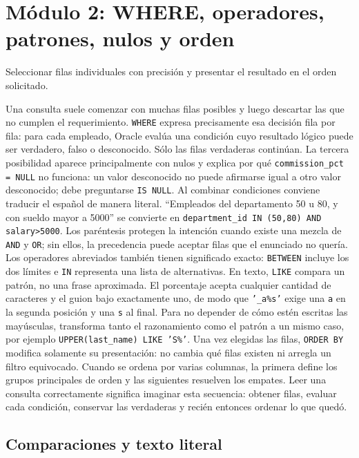 \documentclass[11pt,a4paper]{article}
\newcommand{\campo}[1]{\texttt{#1}}
\begin{document}
\section{Módulo 2: WHERE, operadores, patrones, nulos y orden}

\begin{objetivo}
Seleccionar filas individuales con precisión y presentar el resultado en el orden solicitado.
\end{objetivo}

Una consulta suele comenzar con muchas filas posibles y luego descartar las que no cumplen el
requerimiento. \campo{WHERE} expresa precisamente esa decisión fila por fila: para cada empleado,
Oracle evalúa una condición cuyo resultado lógico puede ser verdadero, falso o desconocido. Sólo las
filas verdaderas continúan. La tercera posibilidad aparece principalmente con nulos y explica por qué
\campo{commission_pct = NULL} no funciona: un valor desconocido no puede afirmarse igual a otro
valor desconocido; debe preguntarse \campo{IS NULL}. Al combinar condiciones conviene traducir el
español de manera literal. ``Empleados del departamento 50 u 80, y con sueldo mayor a 5000'' se
convierte en \campo{department_id IN (50,80) AND salary>5000}. Los paréntesis protegen la intención
cuando existe una mezcla de \campo{AND} y \campo{OR}; sin ellos, la precedencia puede aceptar filas
que el enunciado no quería. Los operadores abreviados también tienen significado exacto:
\campo{BETWEEN} incluye los dos límites e \campo{IN} representa una lista de alternativas. En texto,
\campo{LIKE} compara un patrón, no una frase aproximada. El porcentaje acepta cualquier cantidad de
caracteres y el guion bajo exactamente uno, de modo que \campo{'\_a\%s'} exige una \campo{a} en la
segunda posición y una \campo{s} al final. Para no depender de cómo estén escritas las mayúsculas,
transforma tanto el razonamiento como el patrón a un mismo caso, por ejemplo
\campo{UPPER(last_name) LIKE 'S\%'}. Una vez elegidas las filas, \campo{ORDER BY} modifica solamente
su presentación: no cambia qué filas existen ni arregla un filtro equivocado. Cuando se ordena por
varias columnas, la primera define los grupos principales de orden y las siguientes resuelven los
empates. Leer una consulta correctamente significa imaginar esta secuencia: obtener filas, evaluar
cada condición, conservar las verdaderas y recién entonces ordenar lo que quedó.

\subsection{Comparaciones y texto literal}
\end{document}
